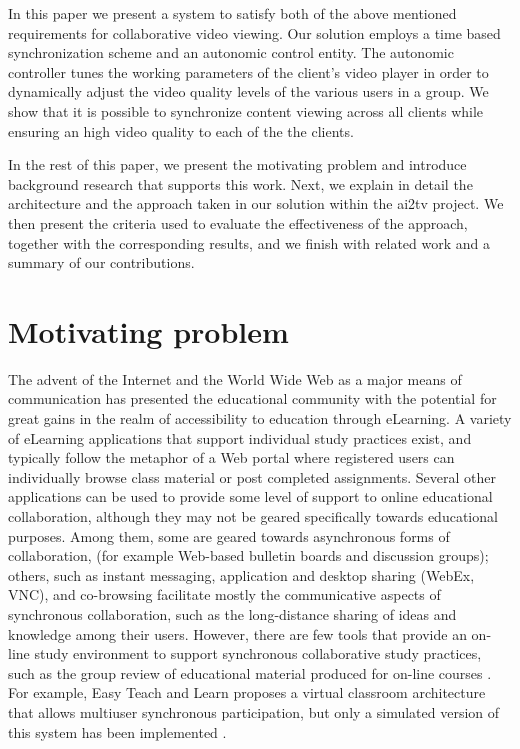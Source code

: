 \documentclass{sig-alternate}
\begin{document}
In this paper we present a system to satisfy both of the above
mentioned requirements for collaborative video viewing.  Our solution
employs a time based synchronization scheme and an autonomic control
entity.  The autonomic controller tunes the working parameters of the
client's video player in order to dynamically adjust the video quality
levels of the various users in a group.  We show that it is possible
to synchronize content viewing across all clients while ensuring an
high video quality to each of the the clients.

In the rest of this paper, we present the motivating problem and
introduce background research that supports this work.  Next, we
explain in detail the architecture and the approach taken in our
solution within the ai2tv project.  We then present the criteria used
to evaluate the effectiveness of the approach, together with the
corresponding results, and we finish with related work and a summary
of our contributions.

\section{Motivating problem} \label{background}
The advent of the Internet and the World Wide Web as a major means of
communication has presented the educational community with the
potential for great gains in the realm of accessibility to education
through eLearning.  A variety of eLearning applications that support
individual study practices exist, and typically follow the metaphor of
a Web portal where registered users can individually browse class
material or post completed assignments.  Several other applications
can be used to provide some level of support to online educational
collaboration, although they may not be geared specifically towards
educational purposes.  Among them, some are geared towards
asynchronous forms of collaboration, (for example Web-based bulletin
boards and discussion groups); others, such as instant messaging,
application and desktop sharing (WebEx, VNC), and co-browsing
\cite{CAPPS, LIEBERMAN, SIDLER} facilitate mostly the communicative
aspects of synchronous collaboration, such as the long-distance
sharing of ideas and knowledge among their users.  However, there are
few tools that provide an on-line study environment to support
synchronous collaborative study practices, such as the group review of
educational material produced for on-line courses \cite{WELLS}.  For
example, Easy Teach and Learn proposes a virtual classroom
architecture that allows multiuser synchronous participation, but only
a simulated version of this system has been implemented \cite{WALTER}.
\end{document}
